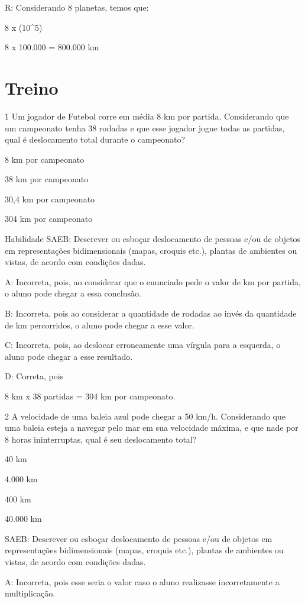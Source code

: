 {R: Considerando 8 planetas, temos que:

8 x (10^5)

8 x 100.000 = 800.000 km

\section{Treino}

\num{1} Um jogador de Futebol corre em média 8 km por partida. Considerando
que um campeonato tenha 38 rodadas e que esse jogador jogue todas as
partidas, qual é deslocamento total durante o campeonato?
\item 8 km por campeonato
\item 38 km por campeonato
\item 30,4 km por campeonato
\item 304 km por campeonato

Habilidade SAEB: Descrever ou esboçar deslocamento de pessoas e/ou de
objetos em representações bidimensionais (mapas, croquis etc.), plantas
de ambientes ou vistas, de acordo com condições dadas.

A: Incorreta, pois, ao considerar que o enunciado pede o valor de km por
partida, o aluno pode chegar a essa conclusão.

B: Incorreta, pois ao considerar a quantidade de rodadas ao invés da
quantidade de km percorridos, o aluno pode chegar a esse valor.

C: Incorreta, pois, ao deslocar erroneamente uma vírgula para a
esquerda, o aluno pode chegar a esse resultado.

D: Correta, pois

8 km x 38 partidas = 304 km por campeonato.

\num{2} A velocidade de uma baleia azul pode chegar a 50 km/h. Considerando
que uma baleia esteja a navegar pelo mar em sua velocidade máxima, e que
nade por 8 horas ininterruptas, qual é seu deslocamento total?
\item 40 km
\item 4.000 km
\item 400 km
\item 40.000 km

SAEB: Descrever ou esboçar deslocamento de pessoas e/ou de objetos em
representações bidimensionais (mapas, croquis etc.), plantas de
ambientes ou vistas, de acordo com condições dadas.

A: Incorreta, pois esse seria o valor caso o aluno realizasse
incorretamente a multiplicação.

}
